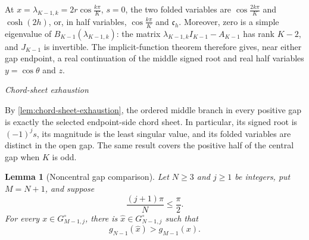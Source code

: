 \documentclass[a4paper,preprint,12pt,nopreprintline,sort&compress]{elsarticle}
\numberwithin{equation}{section}
\newtheorem{lemma}[theorem]{Lemma}
\theoremstyle{remark}
\newcommand{\proofstage}[1]{%
  \par\medskip\noindent\textit{#1}\par\nobreak\smallskip}
\begin{document}
At \(x=\lambda_{K-1,k}=2r\cos\frac{k\pi}{K}\), \(s=0\), the two
folded variables are \(\cos\frac{2k\pi}{K}\) and
\(\cosh(2h)\), or, in half variables, \(\cos\frac{k\pi}{K}\) and
\(\mathfrak c_h\).  Moreover, zero is a simple eigenvalue of
\(B_{K-1}(\lambda_{K-1,k})\): the matrix
\(\lambda_{K-1,k}I_{K-1}-A_{K-1}\) has rank \(K-2\), and \(J_{K-1}\) is
invertible.  The implicit-function theorem therefore gives, near either
gap endpoint, a real continuation of the middle signed root and real
half variables \(y=\cos\theta\) and \(z\).

\proofstage{Chord-sheet exhaustion}
By \cref{lem:chord-sheet-exhaustion}, the ordered middle branch in every
positive gap is exactly the selected endpoint-side chord sheet.  In
particular, its signed root is \((-1)^j s\), its magnitude is the least
singular value, and its folded variables are distinct in the open gap.  The
same result covers the positive half of the central gap when \(K\) is odd.

\begin{lemma}[Noncentral gap comparison]
\label{lem:noncentral-gap-comparison}
Let \(N\geq3\) and \(j\geq1\) be integers, put \(M=N+1\), and suppose
\begin{equation}\label{eq:noncentral-domain}
 \frac{(j+1)\pi}{N}\leq\frac{\pi}{2}.
\end{equation}
For every \(x\in G_{M-1,j}^{\circ}\), there is
\(\widehat x\in G_{N-1,j}^{\circ}\) such that
\[
 g_{N-1}(\widehat x)>g_{M-1}(x).
\]
\end{lemma}
\end{document}
